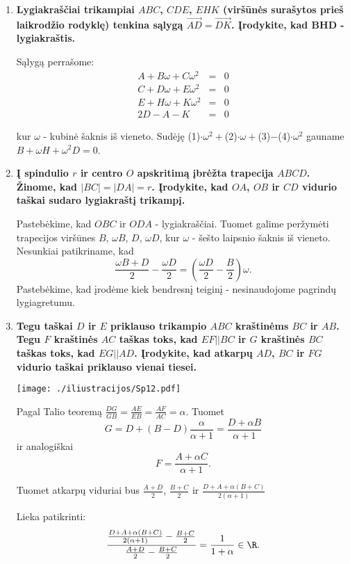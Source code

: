 \begin{enumerate}
\item \textbf{Lygiakraščiai trikampiai $ABC$, $CDE$, $EHK$ (viršūnės surašytos prieš laikrodžio rodyklę) tenkina sąlygą $\vec{AD} = \vec{DK}$. Įrodykite, kad BHD - lygiakraštis.}
\medskip

Sąlygą perrašome:
\begin{eqnarray*}
A + B\omega + C\omega^2 &=& 0\\
C + D\omega + E\omega^2 &=& 0\\
E + H\omega + K\omega^2 &=& 0\\
2D-A -K &=& 0
\end{eqnarray*}

kur $\omega$ - kubinė šaknis iš vieneto. Sudėję (1)$\cdot\omega^2 + $(2)$\cdot\omega +$(3)$ - $(4)$\cdot\omega^2$ gauname $B + \omega H + \omega^2D = 0$.
\medskip

\item \textbf{Į spindulio $r$ ir centro $O$ apskritimą įbrėžta trapecija $ABCD$. Žinome, kad $|BC|=|DA|=r$. Įrodykite, kad $OA$, $OB$ ir $CD$ vidurio taškai sudaro lygiakraštį trikampį. }
\medskip

Pastebėkime, kad $OBC$ ir $ODA$ - lygiakraščiai. Tuomet galime peržymėti trapecijos viršūnes $B$, $\omega B$, $D$, $\omega D$, kur $\omega$ - šešto laipsnio šaknis iš vieneto. Nesunkiai patikriname, kad $$\frac{\omega B + D}{2} - \frac{\omega D}{2} = (\frac{\omega D}{2} - \frac{B}{2}) \omega.$$ Pastebėkime, kad įrodėme kiek bendresnį teiginį - nesinaudojome pagrindų lygiagretumu.
\medskip

\item \textbf{Tegu taškai $D$ ir $E$ priklauso trikampio $ABC$ kraštinėms $BC$ ir $AB$. Tegu $F$ kraštinės $AC$ taškas toks, kad $EF||BC$ ir $G$ kraštinės $BC$ taškas toks, kad $EG||AD$. Įrodykite, kad atkarpų $AD$, $BC$ ir $FG$ vidurio taškai priklauso vienai tiesei.}  
\medskip

\texttt{[image: ./iliustracijos/Sp12.pdf]}

Pagal Talio teoremą $\frac{DG}{GB} = \frac{AE}{EB} = \frac{AF}{AC} = \alpha$. Tuomet
$$G = D + (B-D)\frac{\alpha}{\alpha + 1} = \frac{D+\alpha B}{\alpha + 1}$$
ir analogiškai
$$F = \frac{A+\alpha C}{\alpha + 1}.$$

Tuomet atkarpų viduriai bus $\frac{A+D}{2}$, $\frac{B+C}{2}$ ir $\frac{D+A+\alpha(B+C)}{2(\alpha + 1)}$

Lieka patikrinti: $$\frac{\frac{D+A+\alpha(B+C)}{2(\alpha + 1)} - \frac{B+C}{2}}{\frac{A+D}{2} - \frac{B+C}{2}} = \frac{1}{1+\alpha} \in \R.$$
\medskip


\end{enumerate}
